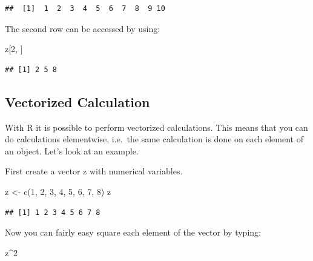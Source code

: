 \documentclass[
]{book}
\newenvironment{Shaded}{\begin{snugshade}}{\end{snugshade}}
\newcommand{\DecValTok}[1]{\textcolor[rgb]{0.00,0.00,0.81}{#1}}
\newcommand{\FunctionTok}[1]{\textcolor[rgb]{0.00,0.00,0.00}{#1}}
\newcommand{\NormalTok}[1]{#1}
\newcommand{\OtherTok}[1]{\textcolor[rgb]{0.56,0.35,0.01}{#1}}
\newcommand{\SpecialCharTok}[1]{\textcolor[rgb]{0.00,0.00,0.00}{#1}}
\begin{document}
\begin{Shaded}
\end{Shaded}

\begin{verbatim}
##  [1]  1  2  3  4  5  6  7  8  9 10
\end{verbatim}

The second row can be accessed by using:

\begin{Shaded}
\begin{Highlighting}[]
\NormalTok{z[}\DecValTok{2}\NormalTok{, ]}
\end{Highlighting}
\end{Shaded}

\begin{verbatim}
## [1] 2 5 8
\end{verbatim}

\hypertarget{vectorized-calculation}{%
\subsection{Vectorized Calculation}\label{vectorized-calculation}}

With R it is possible to perform vectorized calculations. This means that you can do calculations elementwise, i.e.~the same calculation is done on each element of an object. Let's look at an example.

First create a vector z with numerical variables.

\begin{Shaded}
\begin{Highlighting}[]
\NormalTok{z }\OtherTok{\textless{}{-}} \FunctionTok{c}\NormalTok{(}\DecValTok{1}\NormalTok{, }\DecValTok{2}\NormalTok{, }\DecValTok{3}\NormalTok{, }\DecValTok{4}\NormalTok{, }\DecValTok{5}\NormalTok{, }\DecValTok{6}\NormalTok{, }\DecValTok{7}\NormalTok{, }\DecValTok{8}\NormalTok{)}
\NormalTok{z}
\end{Highlighting}
\end{Shaded}

\begin{verbatim}
## [1] 1 2 3 4 5 6 7 8
\end{verbatim}

Now you can fairly easy square each element of the vector by typing:

\begin{Shaded}
\begin{Highlighting}[]
\NormalTok{z}\SpecialCharTok{\^{}}\DecValTok{2}
\end{Highlighting}
\end{Shaded}
\end{document}

